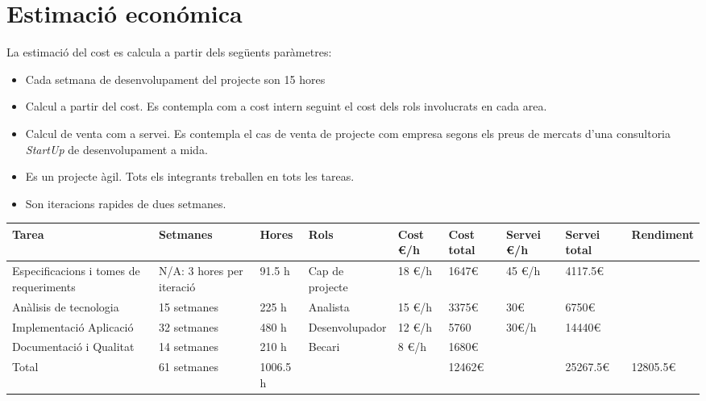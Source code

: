 \section{Estimaci\'{o} econ\'{o}mica}
La estimació del cost es calcula a partir dels següents paràmetres:
\begin{itemize}
\item Cada setmana de desenvolupament del projecte son 15 hores
\item Calcul a partir del cost. Es contempla com a cost intern seguint el cost dels rols involucrats en cada area.
\item Calcul de venta com a servei. Es contempla el cas de venta de projecte com empresa segons els preus de mercats d'una consultoria \textit{StartUp} de desenvolupament a mida.
\item Es un projecte àgil. Tots els integrants treballen en tots les tareas.
\item Son iteracions rapides de dues setmanes.
\end{itemize}

\begin{table}
\begin{tabular}{|p{3cm}|p{2cm}|p{1cm}|p{3cm}|p{1cm}|p{1cm}|p{1cm}|p{2cm}|p{2cm}|}
\hline
Tarea & Setmanes & Hores & Rols & Cost \euro/h & Cost total & Servei \euro/h & Servei total & Rendiment \\ \hline
Especificacions i tomes de requeriments & N/A: 3 hores per iteració & 91.5 h & Cap de projecte & 18 \euro/h & 1647\euro & 45 \euro/h & 4117.5\euro & \\ \hline
Anàlisis de tecnologia & 15 setmanes & 225 h & Analista & 15 \euro/h & 3375\euro & 30\euro & 6750\euro & \\ \hline
Implementació Aplicació & 32 setmanes & 480 h & Desenvolupador & 12 \euro/h & 5760 & 30\euro/h & 14440\euro & \\ \hline
Documentació i Qualitat & 14 setmanes & 210 h & Becari & 8 \euro/h & 1680\euro & & & \\ \hline 
Total & 61 setmanes & 1006.5 h & & & 12462\euro & & 25267.5\euro & 12805.5\euro \\ \hline
\end{tabular}
\end{table}

